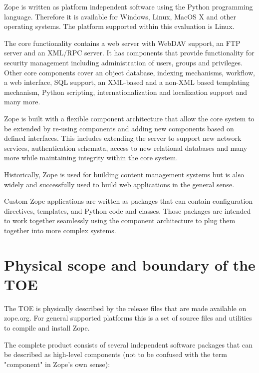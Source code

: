 \documentclass[12pt,english]{scrbook}
\begin{document}
Zope is written as platform independent software using the Python programming
language. Therefore it is available for Windows, Linux, MacOS X and other
operating systems. The platform supported within this evaluation is Linux. 

The core functionality contains a web server with WebDAV support, an FTP server
and an XML/RPC server. It has components that provide functionality for
security management including administration of users, groups and privileges.
Other core components cover an object database, indexing mechanisms, workflow,
a web interface, SQL support, an XML-based and a non-XML based templating
mechanism, Python scripting, internationalization and localization support and
many more.

Zope is built with a flexible component architecture that allow the core system
to be extended by re-using components and adding new components based on
defined interfaces. This includes extending the server to support new network
services, authentication schemata, access to new relational databases and many
more while maintaining integrity within the core system.

Historically, Zope is used for building content management systems but is also
widely and successfully used to build web applications in the general sense.

Custom Zope applications are written as packages that can contain configuration
directives, templates, and Python code and classes. Those packages are intended
to work together seamlessly using the component architecture to plug them
together into more complex systems.

\section{Physical scope and boundary of the TOE}

The TOE  is physically described by the release files that are made available
on zope.org. For general supported platforms this is a set of source files and
utilities to compile and install Zope. 

The complete product consists of several independent software packages that
can be described as high-level components (not to be confused with the term
"component" in Zope's own sense):
\end{document}

